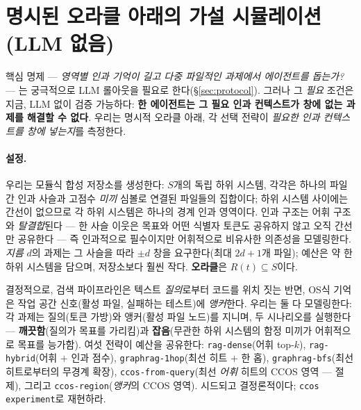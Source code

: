 \documentclass[11pt]{article}
\newcommand{\code}[1]{\texttt{#1}}
\begin{document}
\section{명시된 오라클 아래의 가설 시뮬레이션(LLM 없음)}\label{sec:sim}

핵심 명제 --- \emph{영역별 인과 기억이 길고 다중 파일적인 과제에서 에이전트를 돕는가?} --- 는 궁극적으로 LLM
롤아웃을 필요로 한다(\S\ref{sec:protocol}). 그러나 그 \emph{필요} 조건은 지금, LLM 없이 검증 가능하다: \textbf{한
에이전트는 그 필요 인과 컨텍스트가 창에 없는 과제를 해결할 수 없다}. 우리는 명시적 오라클 아래, 각 선택 전략이
\emph{필요한 인과 컨텍스트를 창에 넣는지}를 측정한다.

\paragraph{설정.} 우리는 모듈식 합성 저장소를 생성한다: $S$개의 독립 하위 시스템, 각각은 하나의 파일 간 인과
사슬과 고점수 \emph{미끼} 심볼로 연결된 파일들의 집합이다; 하위 시스템 사이에는 간선이 없으므로 각 하위 시스템은
하나의 경계 인과 영역이다. 인과 구조는 어휘 구조와 \emph{탈결합}된다 --- 한 사슬 이웃은 목표와 어떤 식별자 토큰도
공유하지 않고 오직 간선만 공유한다 --- 즉 인과적으로 필수이지만 어휘적으로 비유사한 의존성을 모델링한다.
\emph{지름} $d$의 과제는 그 사슬을 따라 $\pm d$ 창을 요구한다(최대 $2d{+}1$개 파일); 예산은 약 한 하위 시스템을
담으며, 저장소보다 훨씬 작다. \textbf{오라클}은 $R(t)\subseteq S$이다.

결정적으로, 검색 파이프라인은 텍스트 \emph{질의}로부터 코드를 위치 짓는 반면, OS식 기억은 작업 공간 신호(활성
파일, 실패하는 테스트)에 \emph{앵커}한다. 우리는 둘 다 모델링한다: 각 과제는 질의(토큰 가방)와 앵커(활성 파일
노드)를 지니며, 두 시나리오를 실행한다 --- \textbf{깨끗함}(질의가 목표를 가리킴)과 \textbf{잡음}(무관한 하위
시스템의 함정 미끼가 어휘적으로 목표를 능가함). 여섯 전략이 예산을 공유한다: \code{rag-dense}(어휘 top-$k$),
\code{rag-hybrid}(어휘 $+$ 인과 점수), \code{graphrag-1hop}(최선 히트 $+$ 한 홉), \code{graphrag-bfs}(최선
히트로부터의 무경계 확장), \code{ccos-from-query}(최선 \emph{어휘} 히트의 CCOS 영역 --- 절제), 그리고
\code{ccos-region}(\emph{앵커}의 CCOS 영역). 시드되고 결정론적이다; \code{ccos experiment}로 재현하라.
\end{document}

